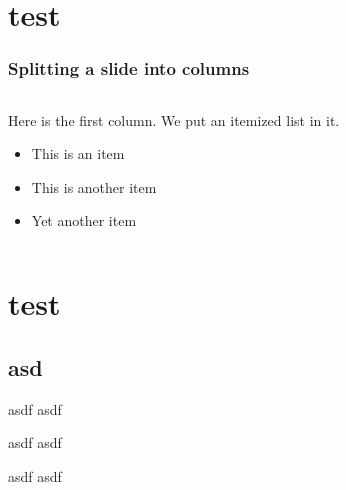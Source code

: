 \documentclass[tinytocinheader,colorblocks]{beamer}
\subtitle{Das Corporate Design in  LaTeX}
\author{Martin Bäker\and Enrico Jörns}
\begin{document}



\begin{frame}[plain]
  \titlepage
\end{frame}

\section{test}

\begin{frame}
\frametitle{Splitting a slide into columns}
\begin{columns}
  \begin{column}{0.5\textwidth}
    Here is the first column.  We put an itemized list in it.
    \begin{itemize}
      \item This is an item
      \item This is another item
      \item Yet another item
    \end{itemize}
  \end{column}
\end{columns}
\end{frame}

\section{test}

\subsection{asd}

\begin{frame}
\begin{block}{asdf}
asdf
\end{block}
\begin{exampleblock}{asdf}
asdf
\end{exampleblock}
\begin{alertblock}{asdf}
asdf
\end{alertblock}
\end{frame}
\end{document}
